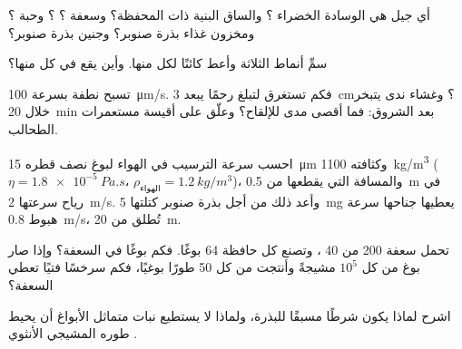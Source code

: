 \begin{exercise}[$\star$]\label{exo:b2:plant-life-cycles:3}
أي جيل هي الوسادة الخضراء ؟ والساق البنية ذات المحفظة؟ وسعفة
؟ ؟ وحبة ؟ ومخزون غذاء بذرة صنوبر؟ وجنين بذرة
صنوبر؟
\end{exercise}

\begin{exercise}[$\star$]\label{exo:b2:plant-life-cycles:4}
سمِّ أنماط  الثلاثة وأعط كائنًا لكل منها. وأين يقع
 في كل منها؟
\end{exercise}

\begin{exercise}[$\star\star$]\label{exo:b2:plant-life-cycles:5}
تسبح نطفة  بسرعة \qty{100}{\micro m/s}. فكم تستغرق لتبلغ رحمًا
يبعد \qty{3}{cm}؟ وغشاء ندى يتبخر خلال \qty{20}{min} بعد الشروق: فما
أقصى مدى للإلقاح؟ وعلّق على أقيسة مستعمرات الطحالب.
\end{exercise}

\begin{exercise}[$\star\star$]\label{exo:b2:plant-life-cycles:6}
احسب سرعة الترسيب في الهواء لبوغ  نصف قطره
\qty{15}{\micro m} وكثافته \qty{1100}{kg/m^3} ($\eta =
\qty{1.8e-5}{Pa.s}$، $\rho_{\text{الهواء}} = \qty{1.2}{kg/m^3}$)،
والمسافة التي يقطعها من \qty{0.5}{m} في رياح سرعتها \qty{2}{m/s}.
وأعد ذلك من أجل بذرة صنوبر كتلتها \qty{5}{mg} يعطيها جناحها سرعة
هبوط \qty{0.8}{m/s}، تُطلق من \qty{20}{m}.
\end{exercise}

\begin{exercise}[$\star\star$]\label{exo:b2:plant-life-cycles:7}
تحمل سعفة  \num{200}  من \num{40} ، وتصنع كل
حافظة \num{64} بوغًا. فكم بوغًا في السعفة؟ وإذا صار بوغ من كل
$10^{5}$ مشيجةً وأنتجت  من كل \num{50} طورًا بوغيًا، فكم سرخسًا
فتيًا تعطي السعفة؟
\end{exercise}

\begin{exercise}[$\star\star$]\label{exo:b2:plant-life-cycles:8}
اشرح لماذا يكون  شرطًا مسبقًا للبذرة، ولماذا لا يستطيع
نبات متماثل الأبواغ أن يحيط طوره المشيجي الأنثوي .
\end{exercise}

